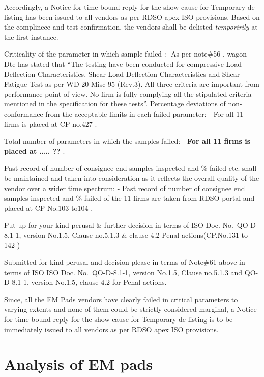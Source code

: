 \documentclass[nofonts,]{tufte-book}
\begin{document}
Accordingly, a Notice for time bound reply for the show cause for
Temporary de-listing has been issued to all vendors as per RDSO apex ISO
provisions. Based on the complinece and test confirmation, the vendors
shall be delisted \emph{temporirily} at the first instance.

Criticality of the parameter in which sample failed :- As per note\#56 ,
wagon Dte has stated that-``The testing have been conducted for
compressive Load Deflection Characteristics, Shear Load Deflection
Characteristics and Shear Fatigue Test as per WD-20-Misc-95 (Rev.3). All
three criteria are important from performance point of view. No firm is
fully complying all the stipulated criteria mentioned in the
specification for these tests''. Percentage deviations of
non-conformance from the acceptable limits in each failed parameter: -
For all 11 firms is placed at CP no.427 .

Total number of parameters in which the samples failed: - \textbf{For
all 11 firms is placed at \ldots.. ?? }.

Past record of number of consignee end samples inspected and \% failed
etc. shall be maintained and taken into consideration as it reflects the
overall quality of the vendor over a wider time spectrum: - Past record
of number of consignee end samples inspected and \% failed of the 11
firms are taken from RDSO portal and placed at CP No.103 to104 .

Put up for your kind perusal \& further decision in terms of ISO Doc.
No.~QO-D-8.1-1, version No.1.5, Clause no.5.1.3 \& clause 4.2 Penal
actions(CP.No.131 to 142 )

Submitted for kind perusal and decision please in terms of Note\#61
above in terms of ISO ISO Doc. No.~QO-D-8.1-1, version No.1.5, Clause
no.5.1.3 and QO-D-8.1-1, version No.1.5, clause 4.2 for Penal actions.

Since, all the EM Pads vendors have clearly failed in critical
parameters to varying extents and none of them could be strictly
considered marginal, a Notice for time bound reply for the show cause
for Temporary de-listing is to be immediately issued to all vendors as
per RDSO apex ISO provisions.

\hypertarget{analysis-of-em-pads}{%
\chapter{Analysis of EM pads}\label{analysis-of-em-pads}}
\end{document}
